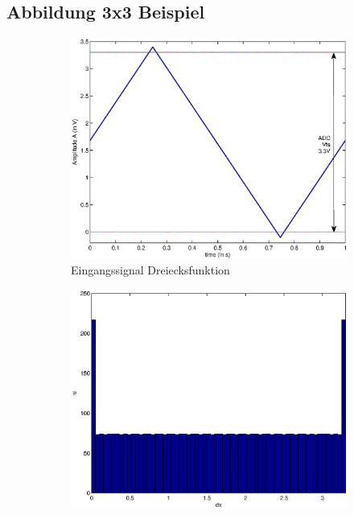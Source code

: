 \documentclass[SSS_Laborbericht.tex]{subfiles}
\begin{document}
\subsection{Abbildung 3x3 Beispiel}
\begin{figure}[!ht]
	\begin{subfigure}{.499\textwidth}
		\centering\small
		\includegraphics[width=\textwidth]{media/matlab/HISTOGRAM/ramp_fkt_samples_5000.eps}
		\caption{Eingangssignal Dreiecksfunktion}
	\end{subfigure}\label{fig:GRUNDL_RAMP_RAMP_3X3}
	\begin{subfigure}{.499\textwidth}
		\centering\small
		\includegraphics[width=\textwidth]{media/matlab/HISTOGRAM/ramp_hist_samples_5000.eps}

\end{subfigure}
\end{figure}
\end{document}
